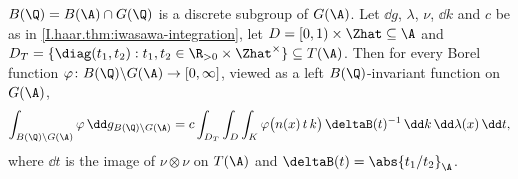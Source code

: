 $B(\Q)=B(\A)\cap G(\Q)$ is a discrete subgroup of $G(\A)$. Let $\dd g$, $\lambda$, $\nu$, $\dd k$ and $c$ be as in
\cref{I.haar.thm:iwasawa-integration}, let $D=[0,1)\times\Zhat\subseteq\A$ and
$D_T=\{\diag(t_1,t_2):t_1,t_2\in\R_{>0}\times\Zhat^\times\}\subseteq T(\A)$. Then for every Borel function
$\varphi\colon B(\Q)\backslash G(\A)\to[0,\infty]$, viewed as a left $B(\Q)$-invariant function on $G(\A)$,
\[
  \int_{B(\Q)\backslash G(\A)}\varphi\,\dd g_{B(\Q)\backslash G(\A)}
  =c\int_{D_T}\int_D\int_K\varphi\bigl(n(x)\,t\,k\bigr)\,\deltaB(t)^{-1}\,\dd k\,\dd\lambda(x)\,\dd t,
\]
where $\dd t$ is the image of $\nu\otimes\nu$ on $T(\A)$ and $\deltaB(t)=\abs{t_1/t_2}_\A$.
